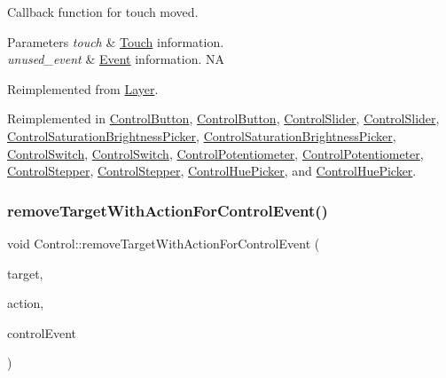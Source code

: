 Callback function for touch moved.


\begin{DoxyParams}{Parameters}
{\em touch} & \hyperlink{classTouch}{Touch} information. \\
\hline
{\em unused\+\_\+event} & \hyperlink{classEvent}{Event} information.  NA \\
\hline
\end{DoxyParams}


Reimplemented from \hyperlink{classLayer_ad614a7a347f171cd6185e7aeef125047}{Layer}.



Reimplemented in \hyperlink{classControlButton_a8c8a5c24adf67ec671fbc113889f0870}{Control\+Button}, \hyperlink{classControlButton_aacecc916b91af98f4f9a2550d678bd44}{Control\+Button}, \hyperlink{classControlSlider_ad7aab266125d50d61a0a58c00f44f94d}{Control\+Slider}, \hyperlink{classControlSlider_adc06e1f4b54e0f72c9359c111b6913ff}{Control\+Slider}, \hyperlink{classControlSaturationBrightnessPicker_a1330b4d2fca4a1a312b1594e6ee6b99c}{Control\+Saturation\+Brightness\+Picker}, \hyperlink{classControlSaturationBrightnessPicker_aea0bada57d1f6e2bb3f456e77e342979}{Control\+Saturation\+Brightness\+Picker}, \hyperlink{classControlSwitch_a74c30d86ef910e4ee32a413153e74042}{Control\+Switch}, \hyperlink{classControlSwitch_a74e7f363deee0b399be486f668dad631}{Control\+Switch}, \hyperlink{classControlPotentiometer_a5da1557dea949b31c82c56ed7aef23eb}{Control\+Potentiometer}, \hyperlink{classControlPotentiometer_aedfddc1d724a15c31897a50eaf1b93e6}{Control\+Potentiometer}, \hyperlink{classControlStepper_ae79c66bc7b2a2f44fbfe2fa3a5782ee9}{Control\+Stepper}, \hyperlink{classControlStepper_a83a981cc66f6e1669b079b83842d6b79}{Control\+Stepper}, \hyperlink{classControlHuePicker_ae287e5f1cd8856c76475825549f098d8}{Control\+Hue\+Picker}, and \hyperlink{classControlHuePicker_a09874584a6a21355d830546ee3b0751d}{Control\+Hue\+Picker}.

\mbox{\label{classControl_a6ec4c2094027c0039a7b6b0f42a2fa7a}} 
\subsubsection{\texorpdfstring{remove\+Target\+With\+Action\+For\+Control\+Event()}{removeTargetWithActionForControlEvent()}\hspace{0.1cm}{\footnotesize\ttfamily [1/2]}}
{\footnotesize\ttfamily void Control\+::remove\+Target\+With\+Action\+For\+Control\+Event (\begin{DoxyParamCaption}\item[{\hyperlink{classRef}{Ref} $\ast$}]{target,  }\item[{Handler}]{action,  }\item[{Event\+Type}]{control\+Event }\end{DoxyParamCaption})\hspace{0.3cm}{\ttfamily [protected]}}


